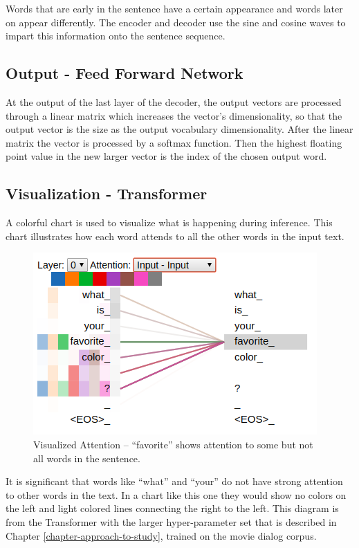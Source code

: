Words that are early in the sentence have a certain appearance and words later on appear differently. The encoder and decoder use the sine and cosine waves to impart this information onto the sentence sequence. 

\subsection{Output - Feed Forward Network}
At the output of the last layer of the decoder, the output vectors are processed through a linear matrix which increases the vector's dimensionality, so that the output vector is the size as the output vocabulary dimensionality. After the linear matrix the vector is processed by a softmax function. Then the highest floating point value in the new larger vector is the index of the chosen output word.


\subsection{Visualization - Transformer}

A colorful chart is used to visualize what is happening during inference. This chart illustrates how each word attends to all the other words in the input text.

\begin{figure}[H]
	\begin{center}
		\includegraphics[scale=2]{Figure_3}
		
		
	\end{center}
	\caption[Visualized Attention Transformer]{Visualized Attention -- ``favorite'' shows attention to some but not all words in the sentence.}
	
	
\end{figure}

It is significant that words like ``what'' and ``your'' do not have strong attention to other words in the text. In a chart like this one they would show no colors on the left and light colored lines connecting the right to the left. This diagram is from the Transformer with the larger hyper-parameter set that is described in Chapter \ref{chapter-approach-to-study}, trained on the movie dialog corpus.


